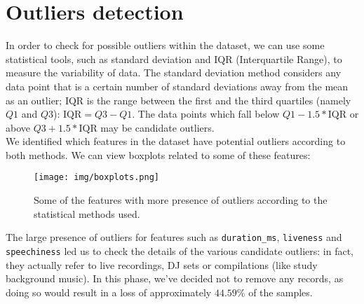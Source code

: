 \section{Outliers detection}
\label{outliers_detection}
In order to check for possible outliers within the dataset, we can use some statistical tools, such as standard deviation and IQR (Interquartile Range), to measure the variability of data. The standard deviation method considers any data point that is a certain number of standard deviations away from the mean as an outlier; IQR is the range between the first and the third quartiles (namely $Q1$ and $Q3$): $\text{IQR} = Q3-Q1$. The data points which fall below $Q1-1.5*\text{IQR}$ or above $Q3+1.5*\text{IQR}$ may be candidate outliers.\\
We identified which features in the dataset have potential outliers according to both methods. We can view boxplots related to some of these features:
\begin{figure}[H]
    \centering
    \texttt{[image: img/boxplots.png]}
    \caption{Some of the features with more presence of outliers according to the statistical methods used.}
    \label{fig:enter-label}
\end{figure}
The large presence of outliers for features such as \texttt{duration\_ms}, \texttt{liveness} and \texttt{speechiness} led us to check the details of the various candidate outliers: in fact, they actually refer to live recordings, DJ sets or compilations (like study background music). In this phase, we’ve decided not to remove any records, as doing so would result in a loss of approximately $44.59\%$ of the samples.
\newpage
